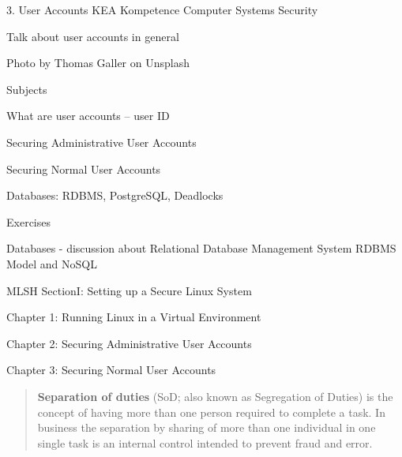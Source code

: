 \documentclass[Screen16to9,17pt]{foils}
\begin{document}
\mytitlepage
{3. User Accounts}
{KEA Kompetence Computer Systems Security \the\year}






\begin{list2}
\item Talk about user accounts in general
\end{list2}

  Photo by Thomas Galler on Unsplash


\begin{list1}
\item Subjects
\begin{list2}
\item What are user accounts -- user ID
\item Securing Administrative User Accounts
\item Securing Normal User Accounts
\item Databases: RDBMS, PostgreSQL, Deadlocks
\end{list2}
\item Exercises
\begin{list2}
\item Databases - discussion about Relational Database Management System RDBMS Model and NoSQL
\end{list2}
\end{list1}




MLSH SectionI: Setting up a Secure Linux System
\begin{list1}
\item Chapter 1: Running Linux in a Virtual Environment
\item Chapter 2: Securing Administrative User Accounts
\item Chapter 3: Securing Normal User Accounts
\end{list1}




\begin{quote}
{\bf Separation of duties} (SoD; also known as Segregation of Duties) is the concept of having more than one person required to complete a task. In business the separation by sharing of more than one individual in one single task is an internal control intended to prevent fraud and error.
\end{quote}
\end{document}
